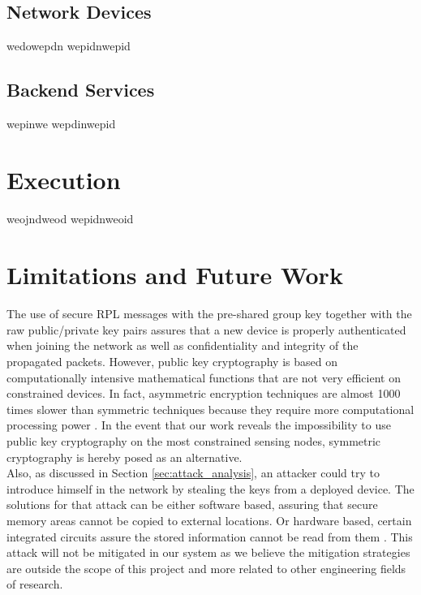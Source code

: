 \subsection{Network Devices}

wedowepdn
wepidnwepid

\subsection{Backend Services}


wepinwe
wepdinwepid
\section{Execution}

weojndweod
wepidnweoid

\section{Limitations and Future Work}
\paragraph{}
The use of secure RPL messages with the pre-shared group key together with the raw public/private key pairs assures that a new device is properly authenticated when joining the network as well as confidentiality and integrity of the propagated packets. However, public key cryptography is based on computationally intensive mathematical functions that are not very efficient on constrained devices. In fact, asymmetric encryption techniques are almost 1000 times slower than symmetric techniques because they require more computational processing power \cite{Kumar2011}. In the event that our work reveals the impossibility to use public key cryptography on the most constrained sensing nodes, symmetric cryptography is hereby posed as an alternative.\\
Also, as discussed in Section \ref{sec:attack_analysis}, an attacker could try to introduce himself in the network by stealing the keys from a deployed device. The solutions for that attack can be either software based, assuring that secure memory areas cannot be copied to external locations. Or hardware based, certain integrated circuits assure the stored information cannot be read from them \cite{Lesjak2014}. This attack will not be mitigated in our system as we believe the mitigation strategies are outside the scope of this project and more related to other engineering fields of research.\\